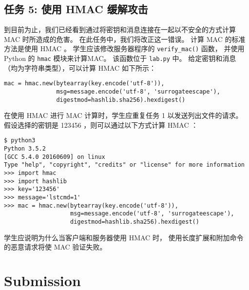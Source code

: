 \subsection{任务 5: 使用 HMAC 缓解攻击}

到目前为止，我们已经看到通过将密钥和消息连接在一起以不安全的方式计算 MAC 时所造成的危害。
在此任务中，我们将改正这一错误。
计算 MAC 的标准方法是使用 HMAC 。
学生应该修改服务器程序的 \texttt{verify\_mac()} 函数，
并使用 Python 的 \texttt{hmac} 模块来计算MAC。
该函数位于 \texttt{lab.py} 中。
给定密钥和消息（均为字符串类型），可以计算 HMAC 如下所示：

\begin{lstlisting}
mac = hmac.new(bytearray(key.encode('utf-8')),
               msg=message.encode('utf-8', 'surrogateescape'),
               digestmod=hashlib.sha256).hexdigest()
\end{lstlisting}

在使用 HMAC 进行 MAC 计算时，学生应重复任务 1 以发送列出文件的请求。
假设选择的密钥是 123456 ，则可以通过以下方式计算 HMAC ：

\begin{lstlisting}
$ python3
Python 3.5.2
[GCC 5.4.0 20160609] on linux
Type "help", "copyright", "credits" or "license" for more information
>>> import hmac
>>> import hashlib
>>> key='123456'
>>> message='lstcmd=1'
>>> mac = hmac.new(bytearray(key.encode('utf-8')),
                   msg=message.encode('utf-8', 'surrogateescape'),
                   digestmod=hashlib.sha256).hexdigest()
\end{lstlisting}

学生应说明为什么当客户端和服务器使用 HMAC 时，
使用长度扩展和附加命令的恶意请求将使 MAC 验证失败。

\section{Submission}





